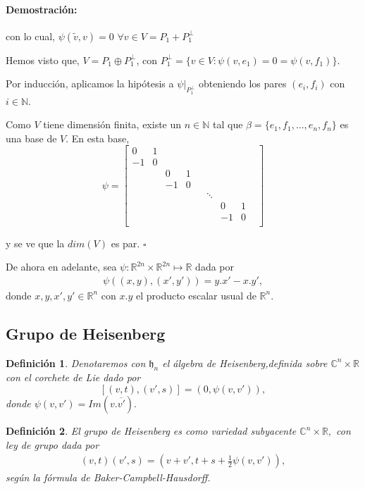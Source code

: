 \documentclass[12pt]{article}
\newtheorem{definition}{Definición}
\newenvironment{proof}{\paragraph{Demostración:}}{\hfill$\square$}
\begin{document}
\begin{proof}
 con lo cual, $\psi(\tilde{v},v)=0$ $\forall v \in V=P_1 + P_1^{\bot}$
 
 
Hemos visto que, $V=P_1 \oplus P_1^{\bot}$, con $P_1^{\bot}=\{v \in V : \psi(v,e_1)=0=\psi(v,f_1)\}$.

Por inducción, aplicamos la hipótesis a $\psi|_{P_1^{\bot}}$ obteniendo los pares $(e_i,f_i)$ con $i \in \mathbb{N}$.

Como $V$ tiene dimensión finita, existe un $n \in \mathbb{N}$ tal que  $\beta=\{e_1,f_1,...,e_n,f_n\}$ es una base de $V$.
En esta base, 
$$\psi = 
\begin{bmatrix}
 0 & 1 & & & & & & &\\ 
 -1& 0 & & & & & & &\\
 & & 0 & 1 & & & & &\\
 & & -1 & 0 & & & & &\\
 & &  &  & & \ddots & & &\\
 & &  &  & & & 0 & 1 &\\
 & &  &  & & & -1 & 0 &\\ 
\end{bmatrix}
$$

y se ve que la $dim(V)$ es par. 
\end{proof}
\newline


De ahora en adelante, sea $\psi :\mathbb{R}^{2n} \times \mathbb{R}^{2n}\mapsto \mathbb{R}$ dada por 
$$ \begin{aligned}
\psi((x,y),(x',y'))=y.x'-x.y' ,
\end{aligned}$$
donde $x,y,x',y' \in \mathbb{R}^n$ con  $x.y$ el producto escalar usual de $\mathbb{R}^n$.

\subsection{Grupo de Heisenberg}
\begin{definition}
Denotaremos con $\mathfrak{h}_n$ el álgebra de Heisenberg,definida sobre
$\mathbb{C}^n \times \mathbb{R}$  con el corchete de Lie dado por 
$$
[(v,t),(v',s)]=(0,\psi(v,v')),
$$
donde  $\psi (v,v')=Im(v.\overline{v'}).$
\end{definition}

\begin{definition}
El grupo de Heisenberg es como variedad subyacente $\mathbb{C}^{n}\times \mathbb{R},$ con
ley de grupo dada por 
$$\begin{aligned}
(v,t)(v',s)=(v+v',t+s+ \frac{1}{2} \psi(v,v')),
\end{aligned}$$
según la fórmula de Baker-Campbell-Hausdorff.
\end{definition}
\end{document}
